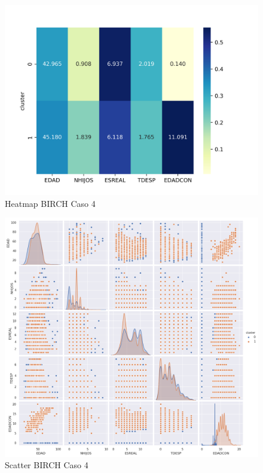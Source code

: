 \begin{figure}[H] %
	\centering
	\includegraphics[scale=0.5]{heatmap-br4.png}  %
	\caption{Heatmap BIRCH Caso 4} 
	\label{fig:hm-br-caso4}
\end{figure}

\begin{figure}[H] %
	\centering
	\includegraphics[scale=0.38]{birch4.png}  %
	\caption{Scatter BIRCH Caso 4} 
	\label{fig:sc-br-caso4}
\end{figure}

